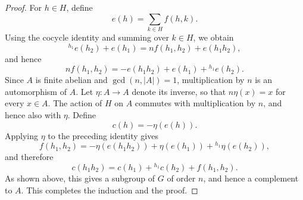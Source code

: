 \documentclass[../Odyssey_Project.tex]{subfiles}
\begin{document}
\begin{proof}
For $h\in H$, define
\[
    e(h)=\sum_{k\in H} f(h,k).
\]
Using the cocycle identity and summing over $k\in H$, we obtain
\[
    {}^{h_1}e(h_2)+e(h_1)
    =n f(h_1,h_2)+e(h_1h_2),
\]
and hence
\[
    n f(h_1,h_2)
    =-e(h_1h_2)+e(h_1)+{}^{h_1}e(h_2).
\]
Since $A$ is finite abelian and $\gcd(n,\lvert A\rvert)=1$, multiplication by $n$ is an automorphism of $A$. Let $\eta\colon A\to A$ denote its inverse, so that $n\eta(x)=x$ for every $x\in A$. The action of $H$ on $A$ commutes with multiplication by $n$, and hence also with $\eta$. Define
\[
    c(h)=-\eta(e(h)).
\]
Applying $\eta$ to the preceding identity gives
\[
    f(h_1,h_2)
    =-\eta(e(h_1h_2))+\eta(e(h_1))+{}^{h_1}\eta(e(h_2)),
\]
and therefore
\[
    c(h_1h_2)
    =c(h_1)+{}^{h_1}c(h_2)+f(h_1,h_2).
\]
As shown above, this gives a subgroup of $G$ of order $n$, and hence a complement to $A$. This completes the induction and the proof.
\end{proof}
\end{document}
